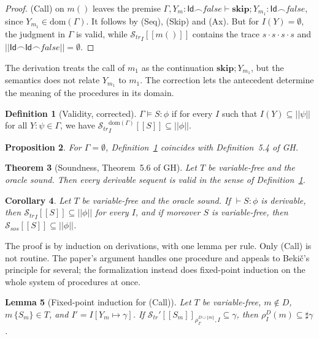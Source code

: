 \documentclass[11pt]{article}
\newcommand{\sem}[1]{[\![ #1 ]\!]}
\newcommand{\fsem}[1]{|\!|#1|\!|}
\newcommand{\Str}{{\mathcal{S}_{\mathit{tr}}}}
\newcommand{\Ssos}{{\mathcal{S}_{\mathit{sos}}}}
\newcommand{\chop}{\smallfrown}
\newcommand{\Id}{\mathsf{Id}}
\newcommand{\dup}{\sharp}
\newcommand{\dom}{\mathrm{dom}}
\newcommand{\kw}[1]{\mathbf{#1}}
\newcommand{\skipS}{\kw{skip}}
\newcommand{\call}[1]{#1()}
\newcommand{\GH}[1]{#1 of GH}
\theoremstyle{plain}
\newtheorem{theorem}{Theorem}[section]
\newtheorem{lemma}[theorem]{Lemma}
\newtheorem{proposition}[theorem]{Proposition}
\newtheorem{corollary}[theorem]{Corollary}
\theoremstyle{definition}
\newtheorem{definition}[theorem]{Definition}
\theoremstyle{remark}
\begin{document}
\begin{proof}
  (Call) on $\call{m}$ leaves the premise
  $\Gamma, Y_m : \Id\chop\mathit{false} \vdash \skipS; Y_{m_1} :
  \Id\chop\mathit{false}$, since $Y_{m_1} \in \dom(\Gamma)$. It follows by
  (Seq), (Skip) and (Ax). But for $I(Y) = \emptyset$, the judgment in
  $\Gamma$ is valid, while $\Str_I\sem{\call{m}}$ contains the trace
  $s \cdot s \cdot s \cdot s$ and $\fsem{\Id\chop\Id\chop\mathit{false}} =
  \emptyset$.
\end{proof}

The derivation treats the call of $m_1$ as the continuation $\skipS;
Y_{m_1}$, but the semantics does not relate $Y_{m_1}$ to $m_1$. The
correction lets the antecedent determine the meaning of the procedures in
its domain.

\begin{definition}[Validity, corrected]\label{def:valid}
  $\Gamma \models S : \phi$ if for every $I$ such that
  $I(Y) \subseteq \fsem{\psi}$ for all $Y : \psi \in \Gamma$, we have
  $\Str^{\dom(\Gamma)}_I\sem{S} \subseteq \fsem{\phi}$.
\end{definition}

\begin{proposition}\label{prop:empty}
  For $\Gamma = \emptyset$, Definition~\ref{def:valid} coincides with
  \GH{Definition~5.4}.
\end{proposition}

\begin{theorem}[Soundness, \GH{Theorem~5.6}]\label{thm:sound}
  Let $T$ be variable-free and the oracle sound. Then every derivable
  sequent is valid in the sense of Definition~\ref{def:valid}.
\end{theorem}

\begin{corollary}\label{cor:sound}
  Let $T$ be variable-free and the oracle sound. If $\vdash S : \phi$ is
  derivable, then $\Str_I\sem{S} \subseteq \fsem{\phi}$ for every $I$, and
  if moreover $S$ is variable-free, then $\Ssos\sem{S} \subseteq
  \fsem{\phi}$.
\end{corollary}

The proof is by induction on derivations, with one lemma per rule. Only
(Call) is not routine. The paper's argument handles one procedure and
appeals to Beki\v{c}'s principle for several; the formalization instead does
fixed-point induction on the whole system of procedures at once.

\begin{lemma}[Fixed-point induction for (Call)]\label{lem:call}
  Let $T$ be variable-free, $m \notin D$, $m\,\{S_m\} \in T$, and
  $I' = I[Y_m \mapsto \gamma]$. If
  $\Str'\sem{S_m}_{\rho^{D \cup \{m\}}_{I'}, I} \subseteq \gamma$, then
  $\rho^D_I(m) \subseteq \dup\gamma$.
\end{lemma}
\end{document}
